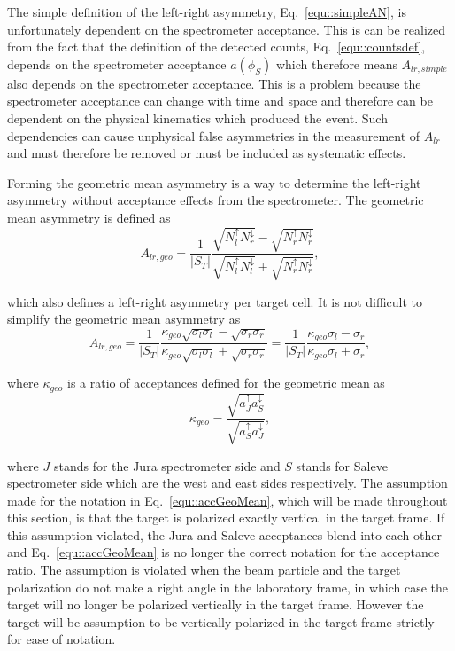 The simple definition of the left-right asymmetry, Eq.~\ref{equ::simpleAN}, is
unfortunately dependent on the spectrometer acceptance.  This is can be realized
from the fact that the definition of the detected counts,
Eq.~\ref{equ::countsdef}, depends on the spectrometer acceptance $a(\phi_S)$
which therefore means $A_{lr,simple}$ also depends on the spectrometer
acceptance.  This is a problem because the spectrometer acceptance can change
with time and space and therefore can be dependent on the physical kinematics
which produced the event.  Such dependencies can cause unphysical false
asymmetries in the measurement of $A_{lr}$ and must therefore be removed or must
be included as systematic effects. \par

Forming the geometric mean asymmetry is a way to determine the left-right
asymmetry without acceptance effects from the spectrometer.  The geometric mean
asymmetry is defined as
\begin{equation}
  \label{equ::ANgeomean}
  A_{lr,geo} =
  \frac{1}{|S_T|}
  \frac{\sqrt{N_l^{\uparrow}N_r^{\downarrow}}
    - \sqrt{N_r^{\uparrow}N_r^{\downarrow}}
  }{
    \sqrt{N_l^{\uparrow}N_l^{\downarrow}}
    + \sqrt{N_r^{\uparrow}N_r^{\downarrow}} },
\end{equation}

\noindent
which also defines a left-right asymmetry per target cell.  It is not difficult
to simplify the geometric mean asymmetry as
\begin{equation}
  \label{equ::ANgeomean_expand}
  A_{lr,geo} = \frac{1}{|S_T|}\frac{\kappa_{geo}
    \sqrt{\sigma_l\sigma_l} -
    \sqrt{\sigma_r\sigma_r}}{\kappa_{geo}
    \sqrt{\sigma_l\sigma_l} + \sqrt{\sigma_r\sigma_r}}
  = \frac{1}{|S_T|}\frac{\kappa_{geo}\sigma_l - \sigma_r}{
    \kappa_{geo}\sigma_l + \sigma_r},
\end{equation}

\noindent
where $\kappa_{geo}$ is a ratio of acceptances defined for the geometric mean as
\begin{equation}
  \kappa_{geo} =
  \frac{
    \sqrt{a^\uparrow_J a^\downarrow_S}
    }{
    \sqrt{a^\uparrow_S a^\downarrow_J}
  },
  \label{equ::accGeoMean}
\end{equation}

\noindent
where $J$ stands for the Jura spectrometer side and $S$ stands for Saleve
spectrometer side which are the west and east sides respectively.  The
assumption made for the notation in Eq.~\ref{equ::accGeoMean}, which will be
made throughout this section, is that the target is polarized exactly vertical
in the target frame.  If this assumption violated, the Jura and Saleve
acceptances blend into each other and Eq.~\ref{equ::accGeoMean} is no longer the
correct notation for the acceptance ratio.  The assumption is violated when the
beam particle and the target polarization do not make a right angle in the
laboratory frame, in which case the target will no longer be polarized
vertically in the target frame.  However the target will be assumption to be
vertically polarized in the target frame strictly for ease of notation.

